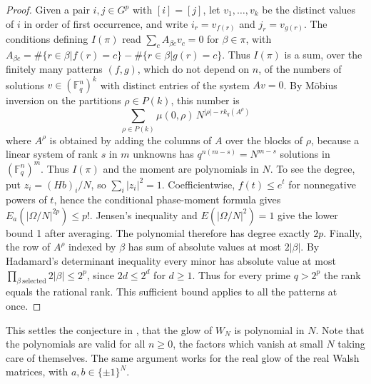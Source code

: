 \documentclass[11pt,a4paper]{article}
\theoremstyle{remark}
\begin{document}
\begin{proof}
Given a pair $i,j\in G^p$ with $[i]=[j]$, let $v_1,\ldots,v_k$ be the distinct values of $i$ in order of first occurrence, and write $i_r=v_{f(r)}$ and $j_r=v_{g(r)}$. The conditions defining $I(\pi)$ read $\sum_cA_{\beta c}v_c=0$ for $\beta\in\pi$, with $A_{\beta c}=\#\{r\in\beta|f(r)=c\}-\#\{r\in\beta|g(r)=c\}$. Thus $I(\pi)$ is a sum, over the finitely many patterns $(f,g)$, which do not depend on $n$, of the numbers of solutions $v\in(\mathbb F_q^n)^k$ with distinct entries of the system $Av=0$. By M\"obius inversion on the partitions $\rho\in P(k)$, this number is
$$\sum_{\rho\in P(k)}\mu(0,\rho)\,N^{|\rho|-rk_q(A^\rho)}$$
where $A^\rho$ is obtained by adding the columns of $A$ over the blocks of $\rho$, because a linear system of rank $s$ in $m$ unknowns has $q^{n(m-s)}=N^{m-s}$ solutions in $(\mathbb F_q^n)^m$. Thus $I(\pi)$ and the moment are polynomials in $N$. To see the degree, put $z_i=(Hb)_i/N$, so $\sum_i|z_i|^2=1$. Coefficientwise, $f(t)\le e^t$ for nonnegative powers of $t$, hence the conditional phase-moment formula gives $E_a(|\Omega/N|^{2p})\le p!$. Jensen's inequality and $E(|\Omega/N|^2)=1$ give the lower bound 1 after averaging. The polynomial therefore has degree exactly $2p$. Finally, the row of $A^\rho$ indexed by $\beta$ has sum of absolute values at most $2|\beta|$. By Hadamard's determinant inequality every minor has absolute value at most $\prod_{\beta\ \mathrm{selected}}2|\beta|\le 2^p$, since $2d\le2^d$ for $d\ge1$. Thus for every prime $q>2^p$ the rank equals the rational rank. This sufficient bound applies to all the patterns at once.
\end{proof}

This settles the conjecture in \cite[section 4]{banica}, that the glow of $W_N$ is polynomial in $N$. Note that the polynomials are valid for all $n\geq0$, the factors which vanish at small $N$ taking care of themselves. The same argument works for the real glow of the real Walsh matrices, with $a,b\in\{\pm1\}^N$.

\medskip
\end{document}
